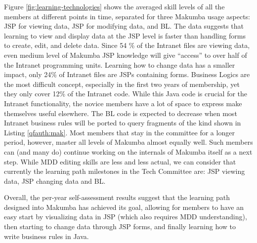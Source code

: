 \documentclass{llncs}
\begin{document}
Figure \ref{fig:learning-technologies} shows the averaged skill levels of all the members at different points in time, separated for three Makumba usage aspects: JSP for viewing data, JSP for modifying data, and BL. The data suggests that learning to view and display data at the JSP level is faster than handling forms to create, edit, and delete data. 
Since 54 \% of the Intranet files are viewing data, even medium level of Makumba JSP knowledge will give ``access'' to over half of the Intranet programming units. 
Learning how to change data has a smaller impact, only 24\% of Intranet files are JSPs containing forms. 
Business Logics are the most difficult concept, especially in the first two years of membership, yet they only cover 12\% of the Intranet code. While this Java code is crucial for the Intranet functionality, the novice members have a lot of space to express make themselves useful elsewhere. The BL code is expected to decrease when most Intranet business rules will be ported to query fragments of the kind shown in Listing \ref{qfauth:mak}.
Most members that stay in the committee for a longer period, however, master all levels of Makumba almost equally well. Such members can (and many do) continue working on the internals of Makumba itself  as a next step. While MDD editing skills are less and less actual, we can consider that currently the learning path milestones in the Tech Committee are: JSP viewing data, JSP changing data and BL.

Overall, the per-year self-assessment results suggest that the learning path designed into Makumba has achieved its goal, allowing for members to have an easy start by visualizing data in JSP (which also requires MDD understanding), then starting to change data through JSP forms, and finally learning how to write business rules in Java.



\end{document}
